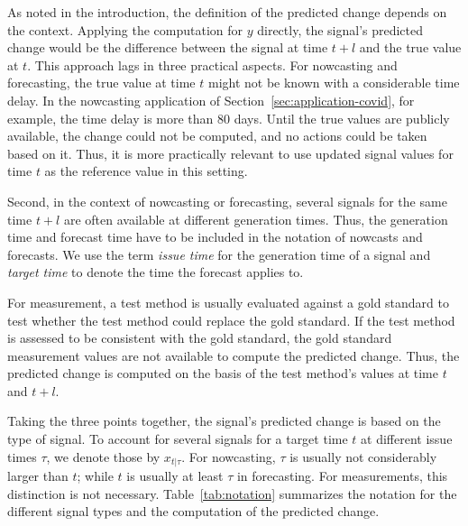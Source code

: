 As noted in the introduction, the definition of the predicted change depends on the context.
Applying the computation for $y$ directly, the signal's predicted change would be the difference between the signal at time $t + l$ and the true value at $t$.
This approach lags in three practical aspects.
For nowcasting and forecasting, the true value at time $t$ might not be known with a considerable time delay.
In the nowcasting application of Section~\ref{sec:application-covid}, for example, the time delay is more than 80 days.
Until the true values are publicly available, the change could not be computed, and no actions could be taken based on it.
Thus, it is more practically relevant to use updated signal values for time $t$ as the reference value in this setting.

Second, in the context of nowcasting or forecasting, several signals for the same time $t + l$ are often available at different generation times.
Thus, the generation time and forecast time have to be included in the notation of nowcasts and forecasts.
We use the term \textit{issue time} for the generation time of a signal and \textit{target time} to denote the time the forecast applies to.

For measurement, a test method is usually evaluated against a gold standard to test whether the test method could replace the gold standard.
If the test method is assessed to be consistent with the gold standard, the gold standard measurement values are not available to compute the predicted change. 
Thus, the predicted change is computed on the basis of the test method's values at time $t$ and $t + l$.

Taking the three points together, the signal's predicted change is based on the type of signal.
To account for several signals for a target time $t$ at different issue times $\tau$, we denote those by $x_{t | \tau}$.
For nowcasting, $\tau$ is usually not considerably larger than $t$; while $t$ is usually at least $\tau$ in forecasting. 
For measurements, this distinction is not necessary.
Table~\ref{tab:notation} summarizes the notation for the different signal types and the computation of the predicted change.

